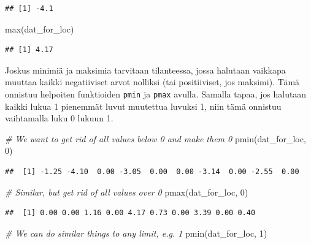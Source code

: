 \documentclass[
]{book}
\newenvironment{Shaded}{\begin{snugshade}}{\end{snugshade}}
\newcommand{\CommentTok}[1]{\textcolor[rgb]{0.56,0.35,0.01}{\textit{#1}}}
\newcommand{\DecValTok}[1]{\textcolor[rgb]{0.00,0.00,0.81}{#1}}
\newcommand{\FunctionTok}[1]{\textcolor[rgb]{0.00,0.00,0.00}{#1}}
\newcommand{\NormalTok}[1]{#1}
\begin{document}
\begin{verbatim}
## [1] -4.1
\end{verbatim}

\begin{Shaded}
\begin{Highlighting}[]
\FunctionTok{max}\NormalTok{(dat\_for\_loc)}
\end{Highlighting}
\end{Shaded}

\begin{verbatim}
## [1] 4.17
\end{verbatim}

Joskus minimiä ja maksimia tarvitaan tilanteessa, jossa halutaan vaikkapa muuttaa kaikki negatiiviset arvot nolliksi (tai positiiviset, jos maksimi). Tämä onnistuu helpoiten funktioiden \texttt{pmin} ja \texttt{pmax} avulla. Samalla tapaa, jos halutaan kaikki lukua 1 pienemmät luvut muutettua luvuksi 1, niin tämä onnistuu vaihtamalla luku 0 lukuun 1.

\begin{Shaded}
\begin{Highlighting}[]
\CommentTok{\# We want to get rid of all values below 0 and make them 0}
\FunctionTok{pmin}\NormalTok{(dat\_for\_loc, }\DecValTok{0}\NormalTok{)}
\end{Highlighting}
\end{Shaded}

\begin{verbatim}
##  [1] -1.25 -4.10  0.00 -3.05  0.00  0.00 -3.14  0.00 -2.55  0.00
\end{verbatim}

\begin{Shaded}
\begin{Highlighting}[]
\CommentTok{\# Similar, but get rid of all values over 0}
\FunctionTok{pmax}\NormalTok{(dat\_for\_loc, }\DecValTok{0}\NormalTok{)}
\end{Highlighting}
\end{Shaded}

\begin{verbatim}
##  [1] 0.00 0.00 1.16 0.00 4.17 0.73 0.00 3.39 0.00 0.40
\end{verbatim}

\begin{Shaded}
\begin{Highlighting}[]
\CommentTok{\# We can do similar things to any limit, e.g. 1}
\FunctionTok{pmin}\NormalTok{(dat\_for\_loc, }\DecValTok{1}\NormalTok{)}
\end{Highlighting}
\end{Shaded}
\end{document}
